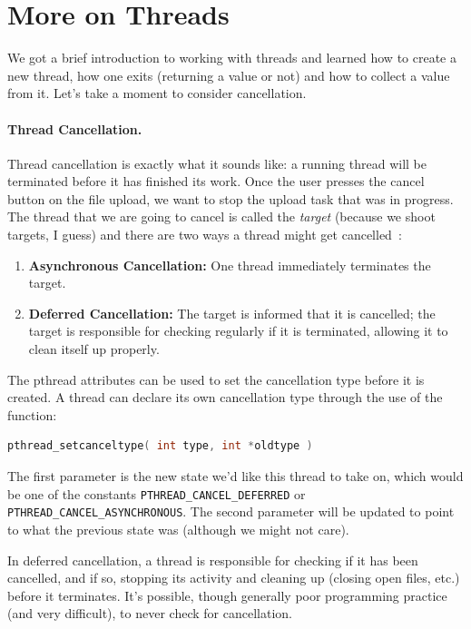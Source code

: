 




\section*{More on Threads}

We got a brief introduction to working with threads and learned how to create a new thread, how one exits (returning a value or not) and how to collect a value from it. Let's take a moment to consider cancellation.

\paragraph{Thread Cancellation.}
Thread cancellation is exactly what it sounds like: a running thread will be terminated before it has finished its work. Once the user presses the cancel button on the file upload, we want to stop the upload task that was in progress. The thread that we are going to cancel is called the \textit{target} (because we shoot targets, I guess) and there are two ways a thread might get cancelled~\cite{osc}:

\begin{enumerate}
	\item \textbf{Asynchronous Cancellation:} One thread immediately terminates the target.
	\item \textbf{Deferred Cancellation:} The target is informed that it is cancelled; the target is responsible for checking regularly if it is terminated, allowing it to clean itself up properly.
\end{enumerate}

The pthread attributes can be used to set the cancellation type before it is created. A thread can declare its own cancellation type through the use of the function:
\begin{lstlisting}[language=C]
pthread_setcanceltype( int type, int *oldtype )
\end{lstlisting}

The first parameter is the new state we'd like this thread to take on, which would be one of the constants \texttt{PTHREAD\_CANCEL\_DEFERRED} or \texttt{PTHREAD\_CANCEL\_ASYNCHRONOUS}. The second parameter will be updated to point to what the previous state was (although we might not care).

In deferred cancellation, a thread is responsible for checking if it has been cancelled, and if so, stopping its activity and cleaning up (closing open files, etc.) before it terminates. It's possible, though generally poor programming practice (and very difficult), to never check for cancellation.

